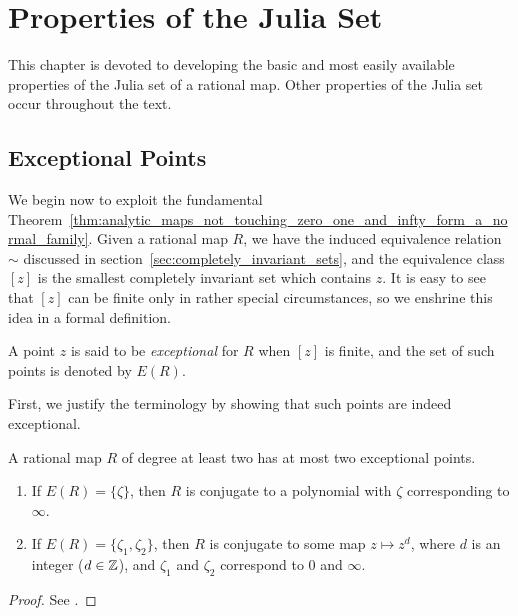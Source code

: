 \chapter{Properties of the Julia Set}
\label{chp:properties_of_the_Julia_set}

This chapter is devoted to developing the basic and most easily available
properties of the Julia set of a rational map. Other properties of the Julia set
occur throughout the text.

\section{Exceptional Points}
\label{exceptional_points}

We begin now to exploit the fundamental
Theorem~\ref{thm:analytic_maps_not_touching_zero_one_and_infty_form_a_normal_family}.
Given a rational map $R$, we have the induced equivalence relation $\sim$
discussed in section~\ref{sec:completely_invariant_sets}, and the equivalence
class $[z]$ is the smallest completely invariant set which contains $z$. It is
easy to see that $[z]$ can be finite only in rather special circumstances, so we
enshrine this idea in a formal definition.

\begin{definition}
    A point $z$ is said to be \emph{exceptional} for $R$ when $[z]$ is finite,
    and the set of such points is denoted by $E(R)$.
\end{definition}

First, we justify the terminology by showing that such points are indeed
exceptional.

\begin{theorem}
    \label{thm:rational_maps_have_at_most_two_exceptional_points}
    A rational map $R$ of degree at least two has at most two exceptional
    points.
    \begin{enumerate}[label=(\roman*)]
        \item If $E(R) = \{\zeta\}$, then $R$ is conjugate to a polynomial with
        $\zeta$ corresponding to $\infty$.
        \item If $E(R) = \{\zeta_1, \zeta_2\}$, then $R$ is conjugate to some
        map $z \mapsto z^d$, where $d$ is an integer ($d \in \mathbb{Z}$), and $\zeta_1$
        and $\zeta_2$ correspond to $0$ and $\infty$.
        \end{enumerate}
\end{theorem}
\begin{proof}
    See \cite[66]{Beardon1991}.
\end{proof}

